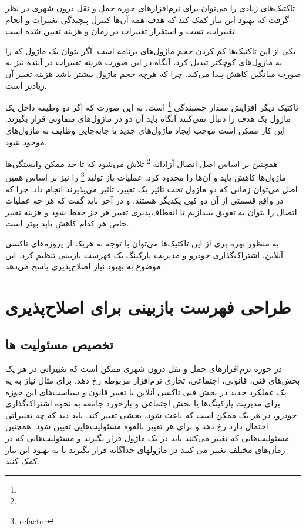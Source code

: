  تاکتیک‌های زیادی را می‌توان برای نرم‌افزار‌های حوزه حمل و‌ نقل درون شهری در نظر گرفت که بهبود این نیاز کمک کند که هدف همه آن‌ها کنترل پیچیدگی تغییرات و انجام تغییرات، تست و استقرار تغییرات در زمان و هزینه تعیین شده است.

یکی از این تاکتیک‌ها کم کردن حجم ماژول‌های برنامه است. اگر بتوان یک ماژول که را به ماژول‌های کوچکتر تبدیل کرد، آنگاه در این صورت هزینه تغییرات در آینده نیز به صورت میانگین کاهش پیدا می‌کند.
چرا که هرچه حجم ماژول بیشتر باشد هزینه تغییر آن زیادتر است.

تاکتیک دیگر افزایش مقدار چسبندگی
\footnote{}
است. به این صورت که اگر دو وظیفه داخل یک ماژول یک هدف را دنبال نمی‌کنند آنگاه باید آن دو در ماژول‌های متفاوتی قرار بگیرند.
این کار ممکن است موجب ایجاد ماژول‌های جدید یا جابه‌جایی وظایف به ماژول‌های موجود شود.

همچنین بر اساس اصل اتصال آزادانه
\footnote{} 
تلاش می‌شود که تا حد ممکن وابستگی‌ها ماژول‌ها کاهش یاید و آن‌ها را محدود کرد. عملیات باز تولید
\footnote{refactor}
را نیز بر اساس همین اصل می‌توان زمانی که دو ماژول تحت تاثیر یک تغییر، تاثیر می‌پذیرند انجام داد. چرا که در واقع قسمتی از آن دو کپی یکدیگر هستند.
و در آخر باید گفت که هر چه عملیات اتصال را بتوان به تعویق بیندازیم تا انعطاف‌پذیری تغییر هر جز حفظ شود و هزینه تغییر خاص هر کدام کاهش یابد بهتر است.


به منظور بهره بری از این تاکتیک‌ها می‌توان با توجه به هریک از پروژه‌های تاکسی آنلاین، اشتراک‌گذاری خودرو و مدیریت پارکینگ یک فهرست بازبینی تنظیم کرد. این موضوع به بهبود نیاز اصلاح‌پذیری پاسخ می‌دهد.

\section{طراحی فهرست بازبینی برای اصلا‌ح‌پذیری}
\subsection{تخصیص مسئولیت ها} 
در حوزه نرم‌افزارهای حمل و نقل درون شهری ممکن است که تغییراتی در هر یک بخش‌های فنی، قانونی، اجتماعی، تجاری نرم‌افزار مربوطه رخ دهد. برای مثال نیاز به یه یک عملکرد جدید در بخش فنی تاکسی آنلاین یا تغییر قانون و سیاست‌های این حوزه برای مدیریت پارکینگ‌ها یا بخش اجتماعی و بازخورد جامعه به نحوه  اشتراک‌گذاری خودرو، در هر یک ممکن است که باعث شود، بخشی تغییر کند. 
باید دید که چه تغییراتی احتمال دارد رخ دهد و برای هر تغییر بالقوه مسئولیت‌هایی تعیین شود. 
همچنین مسئولیت‌هایی که تغییر می‌کنند باید در یک ماژول قرار بگیرند و مسئولیت‌هایی که در زمان‌های مختلف تغییر می کنند در ماژولهای جداگانه قرار بگیرند تا به بهبود این نیاز کمک کنند.

